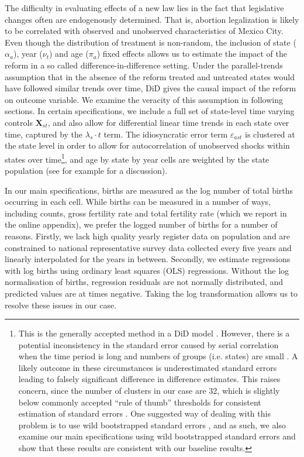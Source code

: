 \documentclass[a4paper, 11pt]{article}
\begin{document}
\begin{spacing}{2}
The difficulty in evaluating effects of a new law lies in the fact that legislative changes often are endogenously determined.  That is, abortion legalization is likely to be correlated with observed and unobserved characteristics of Mexico City.  Even though the distribution of treatment is non-random, the inclusion of state ($\alpha_a$), year ($\nu_t$) and age ($\pi_a$) fixed effects allows us to estimate the impact of the reform in a so called difference-in-difference setting.  Under the parallel-trends assumption that in the absence of the reform treated and untreated states would have followed similar trends over time, DiD gives the causal impact of the reform on outcome variable.  We examine the veracity of this assumption in following sections.  In certain specifications, we include a full set of state-level time varying controls $\bm{X}_{st}$, and also allow for differential linear time trends in each state over time, captured by the $\lambda_{s}\cdot t$ term.  The idiosyncratic error term $\varepsilon_{ast}$ is clustered at the state level in order to allow for autocorrelation of unobserved shocks within states over time\footnote{This is the generally accepted method in a DiD model \citep{Bertrandetal2004}.  However, there is a potential inconsistency in the standard error caused by serial correlation when the time period is long and numbers of groups (i.e. states) are small \citep{Bertrandetal2004}.  A likely outcome in these circumstances is underestimated standard errors leading to falsely significant difference in difference estimates.  This raises concern, since the number of clusters in our case are 32, which is slightly below commonly accepted ``rule of thumb'' thresholds for consistent estimation of standard errors \citep{angrist_mostly_2009,CameronMiller2015}. One suggested way of dealing with this problem is to use wild bootstrapped standard errors \citep{Bertrandetal2004,CameronMiller2015}, and as such, we also examine our main specifications using wild bootstrapped standard errors and show that these results are consistent with our baseline results.}, and age by state by year cells are weighted by the state population (see for example \citet{Dell2015} for a discussion).

In our main specifications, births are measured as the log number of total births occurring in each cell.  While births can be measured in a number of ways, including counts, gross fertility rate and total fertility rate (which we report in the online appendix), we prefer the logged number of births for a number of reasons.  Firstly, we lack high quality yearly register data on population and are constrained to national representative survey data collected every five years and linearly interpolated for the years in between.  %
   Secondly, we estimate regressions with log births using ordinary least squares (OLS) regressions.  Without the log normalisation of births, regression residuals are not normally distributed, and predicted values are at times negative.  Taking the log transformation allows us to resolve these issues in our case.


\end{spacing}
\end{document}

